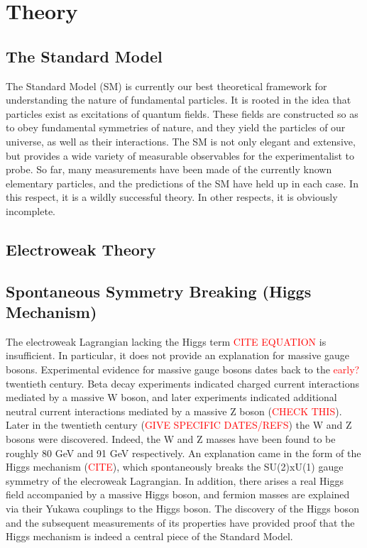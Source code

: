 \chapter{Theory}\label{sec:theory}

\section{The Standard Model}
The Standard Model (SM) is currently our best theoretical framework for understanding the nature of fundamental particles. 
It is rooted in the idea that particles exist as excitations of quantum fields. These fields are constructed so as to obey 
fundamental symmetries of nature, and they yield the particles of our universe, as well as their interactions. The SM is not only 
elegant and extensive, but provides a wide variety of measurable observables for the experimentalist to probe. So far, many 
measurements have been made of the currently known elementary particles, and the predictions of the SM have held up in each case. In 
this respect, it is a wildly successful theory. In other respects, it is obviously incomplete.

\section{Electroweak Theory}


\section{Spontaneous Symmetry Breaking (Higgs Mechanism)}
The electroweak Lagrangian lacking the Higgs term \textcolor{red}{CITE EQUATION} is insufficient. In particular, it does not provide
an explanation for massive gauge bosons. Experimental evidence for massive gauge bosons dates back to the \textcolor{red}{early?}
twentieth century. Beta decay experiments indicated charged current interactions mediated by a massive W boson, and later experiments 
indicated additional neutral current interactions mediated by a massive Z boson (\textcolor{red}{CHECK THIS}). Later in the twentieth 
century (\textcolor{red}{GIVE SPECIFIC DATES/REFS}) the W and Z bosons were discovered. Indeed, the W and Z masses have been found 
to be roughly 80 GeV and 91 GeV respectively. An explanation came in the form of the Higgs mechanism (\textcolor{red}{CITE}),
which spontaneously breaks the SU(2)xU(1) gauge symmetry of the elecroweak Lagrangian. In addition, there arises a real 
Higgs field accompanied by a massive Higgs boson, and fermion masses are explained via their Yukawa couplings to the Higgs boson. 
The discovery of the Higgs boson and the subsequent measurements of its properties have provided proof that the Higgs mechanism 
is indeed a central piece of the Standard Model. 

